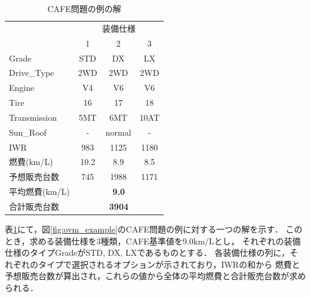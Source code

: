 \begin{table}[tb]
 \caption{CAFE問題の例の解}
 \begin{tabular}{l|c|c|c} \bhline
    \multicolumn{1}{c|}{装備}   & \multicolumn{3}{c}{装備仕様} \\ \cline{2-4}
                 & 1	& 2 	 & 3	\\  \hline
    Grade	 & STD	& DX	 & LX	\\
    Drive\_Type  & 2WD  & 2WD    & 2WD  \\
    Engine	 & V4	& V6	 & V6	\\
    Tire	 & 16	& 17	 & 18	\\
    Transmission & 5MT	& 6MT    & 10AT	\\
    Sun\_Roof    & -    & normal & -    \\ \hline
    IWR          & 983  & 1125   & 1180 \\ %
    燃費(km/L)    & 10.2  & 8.9     & 8.5 \\ %
    予想販売台数  & 745  & 1988   & 1171  \\ \hline
    平均燃費(km/L) & \multicolumn{3}{c}{\bf{9.0}} \\ 
    合計販売台数  & \multicolumn{3}{c}{\bf{3904}} \\ \hline
 \end{tabular}
 \label{tab:ovm_ans}
\end{table}

表\ref{tab:ovm_ans}にて，図\ref{fig:ovm_example}のCAFE問題の例に対する一つの解を示す．
このとき，求める装備仕様を3種類，CAFE基準値を9.0km/Lとし，
それぞれの装備仕様のタイプGradeがSTD, DX, LXであるものとする．
各装備仕様の列に，それぞれのタイプで選択されるオプションが示されており，IWRの和から
燃費と予想販売台数が算出され，これらの値から全体の平均燃費と合計販売台数が求められる．





